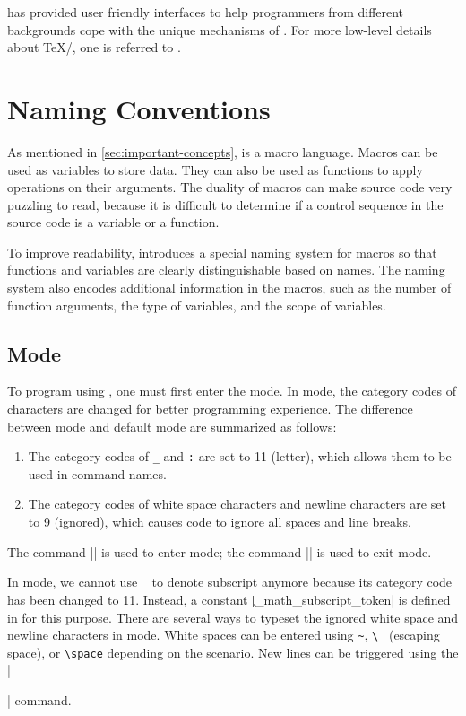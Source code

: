 \documentclass{ltugboat}
\begin{document}
\LTT{} has provided user friendly interfaces to help \LT{} programmers from different backgrounds cope with the unique mechanisms of \LT{}.
For more low-level details about \TeX{}/\LT{}, one is referred to \cite{knuth1984texbook,berry2017latex}.



\section{\LTT{} Naming Conventions}

As mentioned in \cref{sec:important-concepts}, \LT{} is a macro language.
Macros can be used as variables to store data.
They can also be used as functions to apply operations on their arguments.
The duality of macros can make \LT{} source code very puzzling to read, because it is difficult to determine if a control sequence in the source code is a variable or a function.

To improve readability, \LT{} introduces a special naming system for macros so that functions and variables are clearly distinguishable based on names. 
The naming system also encodes additional information in the macros, such as the number of function arguments, the type of variables, and the scope of variables. 


\subsection{\LTT{} Mode}


To program using \LTT{}, one must first enter the \LTT{} mode.
In \LTT{} mode, the category codes of characters are changed for better programming experience.
The difference between \LTT{} mode and default \LT{} mode are summarized as follows:
\begin{enumerate}
    \item The category codes of \verb|_| and \verb|:| are set to 11 (letter), which allows them to be used in command names.
    \item The category codes of white space characters and newline characters are set to 9 (ignored), which causes \LTT{} code to ignore all spaces and line breaks.
\end{enumerate}
The command \inltex|\ExplSyntaxOn| is used to enter \LTT{} mode; the command \inltex|\ExplSyntaxOff| is used to exit \LTT{} mode.

In \LTT{} mode, we cannot use \verb|_| to denote subscript anymore because its category code has been changed to 11. Instead, a constant \inltex|\c_math_subscript_token| is defined in \LTT{} for this purpose.
There are several ways to typeset the ignored white space and newline characters in \LTT{} mode.
White spaces can be entered using \verb|~|, \verb|\ | (escaping space), or \verb|\space| depending on the scenario.
New lines can be triggered using the \inltex|\par| command.
\end{document}
